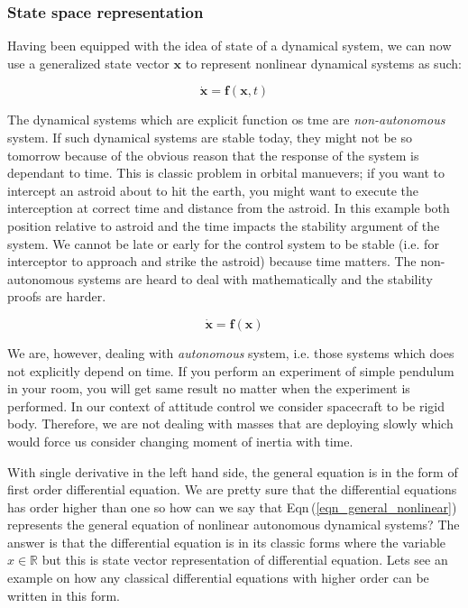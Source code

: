 \documentclass{article}
\begin{document}
\subsubsection*{State space representation}
Having been equipped with the idea of state of a dynamical system, we can now use a generalized state vector $\bm{x}$ to represent nonlinear dynamical systems as such:

$$
\dot{\bm{x}} = \bm{f}(\bm{x}, t)
$$

The dynamical systems which are explicit function os tme are \textit{non-autonomous} system. If such dynamical systems are stable today, they might not be so tomorrow because of the obvious reason that the response of the system is dependant to time. This is classic problem in orbital manuevers; if you want to intercept an astroid about to hit the earth, you might want to execute the interception at correct time and distance from the astroid. In this example both position relative to astroid and the time impacts the stability argument of the system. We cannot be late or early for the control system to be stable (i.e. for interceptor to approach and strike the astroid) because time matters. The non-autonomous systems are heard to deal with mathematically and the stability proofs are harder.

\begin{equation}
  \label{eqn_general_nonlinear}
\dot{\bm{x}} = \bm{f}(\bm{x})
\end{equation}

We are, however, dealing with \textit{autonomous} system, i.e. those systems which does not explicitly depend on time. If you perform an experiment of simple pendulum in your room, you will get same result no matter when the experiment is performed. In our context of attitude control we consider spacecraft to be rigid body. Therefore, we are not dealing with masses that are deploying slowly which would force us consider changing moment of inertia with time.

With single derivative in the left hand side, the general equation is in the form of first order differential equation. We are pretty sure that the differential equations has order higher than one so how can we say that Eqn\,(\ref{eqn_general_nonlinear}) represents the general equation of nonlinear autonomous dynamical systems? The answer is that the differential equation is in its classic forms where the variable $x\in\mathbb{R}$ but this is state vector representation of differential equation. Lets see an example on how any classical differential equations with higher order can be written in this form.
\end{document}
